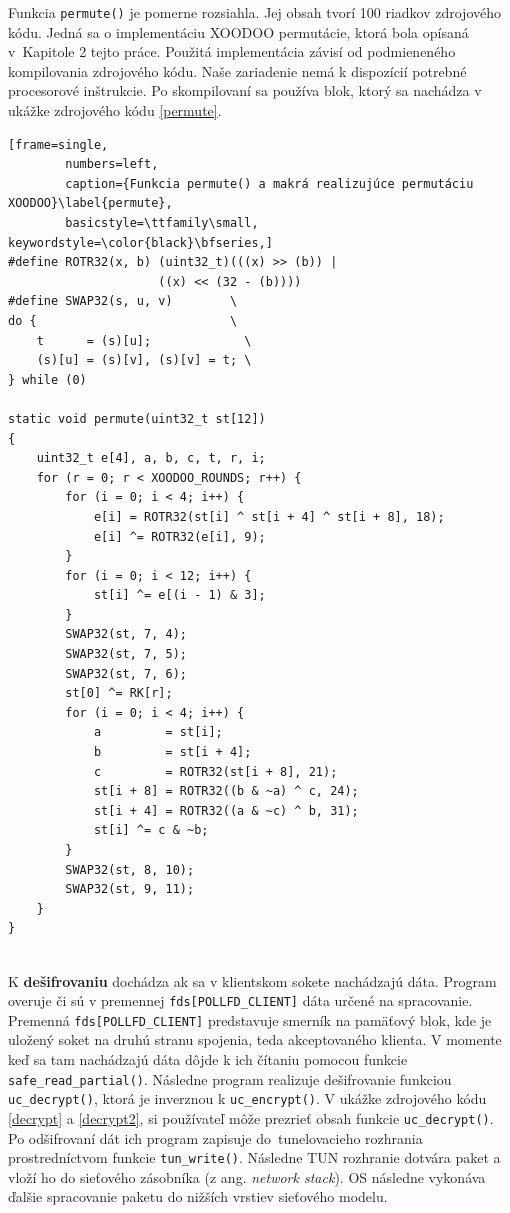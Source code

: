 Funkcia \lstinline|permute()| je pomerne rozsiahla. Jej obsah tvorí 100 riadkov zdrojového kódu. Jedná sa o implementáciu XOODOO permutácie, ktorá bola opísaná v~Kapitole 2 tejto práce. Použitá implementácia závisí od podmieneného kompilovania zdrojového kódu. Naše zariadenie nemá k dispozícií potrebné procesorové inštrukcie. Po skompilovaní sa používa blok, ktorý sa nachádza v ukážke zdrojového kódu \ref{permute}.   

\begin{minipage}{\linewidth} 	
	\begin{lstlisting}[frame=single,
		numbers=left,
		caption={Funkcia permute() a makrá realizujúce permutáciu XOODOO}\label{permute},
		basicstyle=\ttfamily\small, keywordstyle=\color{black}\bfseries,]
#define ROTR32(x, b) (uint32_t)(((x) >> (b)) | 
                     ((x) << (32 - (b))))
#define SWAP32(s, u, v)        \
do {                           \
	t      = (s)[u];             \
	(s)[u] = (s)[v], (s)[v] = t; \
} while (0)
	
static void permute(uint32_t st[12])
{
	uint32_t e[4], a, b, c, t, r, i;	
	for (r = 0; r < XOODOO_ROUNDS; r++) {
		for (i = 0; i < 4; i++) {
			e[i] = ROTR32(st[i] ^ st[i + 4] ^ st[i + 8], 18);
			e[i] ^= ROTR32(e[i], 9);
		}
		for (i = 0; i < 12; i++) {
			st[i] ^= e[(i - 1) & 3];
		}
		SWAP32(st, 7, 4);
		SWAP32(st, 7, 5);
		SWAP32(st, 7, 6);
		st[0] ^= RK[r];
		for (i = 0; i < 4; i++) {
			a         = st[i];
			b         = st[i + 4];
			c         = ROTR32(st[i + 8], 21);
			st[i + 8] = ROTR32((b & ~a) ^ c, 24);
			st[i + 4] = ROTR32((a & ~c) ^ b, 31);
			st[i] ^= c & ~b;
		}
		SWAP32(st, 8, 10);
		SWAP32(st, 9, 11);
	}	
}
	\end{lstlisting}
\end{minipage}\\
K \textbf{dešifrovaniu} dochádza ak sa v klientskom sokete nachádzajú dáta. Program overuje či sú v premennej \lstinline|fds[POLLFD_CLIENT]| dáta určené na spracovanie. Premenná \lstinline|fds[POLLFD_CLIENT]| predstavuje smerník na pamäťový blok, kde je uložený soket na druhú stranu spojenia, teda akceptovaného klienta. V momente keď sa tam nachádzajú dáta dôjde k ich čítaniu pomocou funkcie \lstinline|safe_read_partial()|. Následne program realizuje dešifrovanie funkciou \lstinline|uc_decrypt()|, ktorá je inverznou k \lstinline|uc_encrypt()|. V ukážke zdrojového kódu \ref{decrypt} a \ref{decrypt2}, si používateľ môže prezrieť obsah funkcie \lstinline|uc_decrypt()|. Po odšifrovaní dát ich program zapisuje do~tunelovacieho rozhrania prostredníctvom funkcie \lstinline|tun_write()|. Následne TUN rozhranie dotvára paket a vloží ho do sieťového zásobníka (z ang. \textit{network stack}). OS následne vykonáva ďalšie spracovanie paketu do nižších vrstiev sieťového modelu. 


